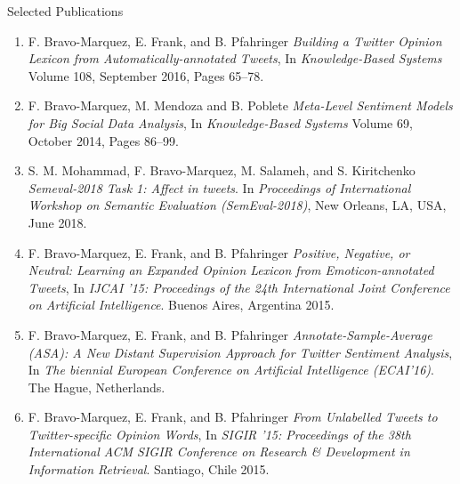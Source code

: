 \documentclass[handout]{beamer}
\begin{document}
\begin{frame}{Selected Publications}
\begin{scriptsize}
\begin{enumerate}
\item F. Bravo-Marquez, E. Frank, and B. Pfahringer \textit{Building a Twitter Opinion Lexicon from Automatically-annotated Tweets}, In \textit{Knowledge-Based Systems}  Volume 108, September 2016, Pages 65–78.
\item F. Bravo-Marquez, M. Mendoza and B. Poblete \textit{Meta-Level Sentiment Models for Big Social Data Analysis}, In \textit{Knowledge-Based Systems} Volume 69, October 2014, Pages 86–99. 
\item S. M. Mohammad, F. Bravo-Marquez, M. Salameh, and S. Kiritchenko  \textit{Semeval-2018 Task 1: Affect in tweets}. In \textit{Proceedings of International Workshop on Semantic Evaluation (SemEval-2018)}, New Orleans, LA, USA, June 2018. 
\item F. Bravo-Marquez, E. Frank, and B. Pfahringer \textit{Positive, Negative, or Neutral: Learning an Expanded Opinion Lexicon from Emoticon-annotated Tweets}, In \textit{IJCAI '15: Proceedings of the 24th International Joint Conference on Artificial Intelligence}. Buenos Aires, Argentina 2015.
\item F. Bravo-Marquez, E. Frank, and B. Pfahringer \textit{Annotate-Sample-Average (ASA): A New Distant Supervision Approach for Twitter Sentiment Analysis}, In \textit{The biennial European Conference  on Artificial Intelligence (ECAI'16)}. The Hague, Netherlands.
\item F. Bravo-Marquez, E. Frank, and B. Pfahringer \textit{From Unlabelled Tweets to Twitter-specific Opinion Words}, In \textit{SIGIR '15: Proceedings of the 38th International ACM SIGIR Conference on Research \& Development in Information Retrieval}. Santiago, Chile 2015.  
\end{enumerate} 
\end{scriptsize}
\end{frame}
\end{document}
